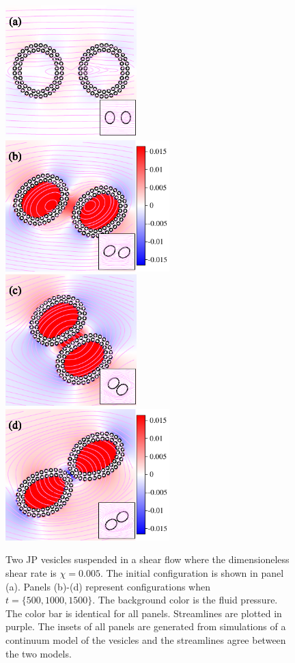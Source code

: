\documentclass[lineno]{jfm}
\begin{document}
\begin{figure}
\centering
\includegraphics[height=2in]{N116_shear_0.pdf}
\includegraphics[height=2in]{N116_shear_2500.pdf}\\
\includegraphics[height=2in]{N116_shear_5000.pdf}
\includegraphics[height=2in]{N116_shear_7500.pdf}
  \caption{\label{figure10} Two JP vesicles suspended in a shear flow
  where the dimensioneless shear rate is $\chi=0.005$. The initial
  configuration is shown in panel (a). Panels (b)-(d) represent configurations when $t = \{500, 1000, 1500\}$.
  The background color is the fluid
  pressure. The color bar is identical for all panels. Streamlines are
  plotted in purple. The insets of all panels are generated from
  simulations of a continuum model of the vesicles and the streamlines
  agree between the two models. }
\end{figure}
\end{document}
